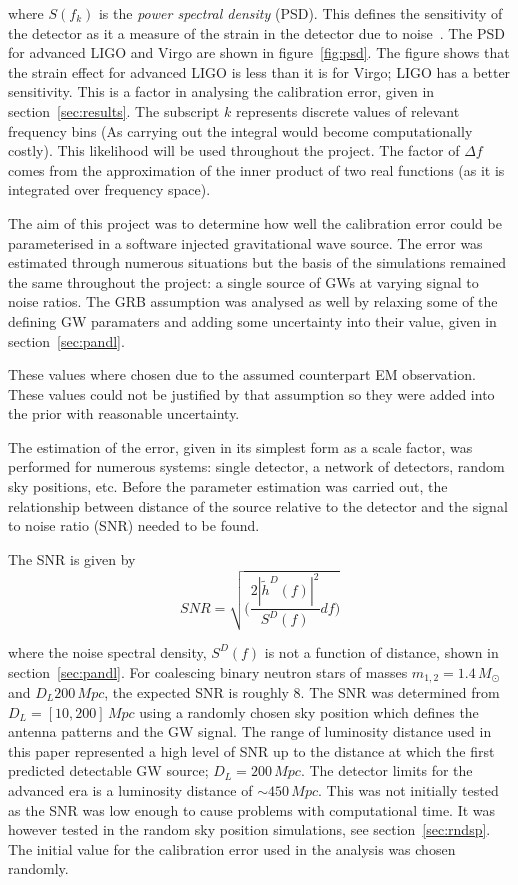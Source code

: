 \documentclass[12pt]{iopart}
\newcommand{\gws}{\tilde{h}}
\begin{document}
where $S(f_{k})$ is the \textit{power spectral density} (PSD). This defines the
sensitivity of the detector as it a measure of the strain in the detector due
to noise~\cite{SathSchutz,sens}. The PSD for advanced LIGO and Virgo are shown
in figure~\ref{fig:psd}. The figure shows that the strain effect for advanced
LIGO is less than it is for Virgo; LIGO has a better sensitivity. This is a
factor in analysing the calibration error, given in section~\ref{sec:results}.
The subscript $k$ represents discrete values of relevant frequency bins (As
carrying out the integral would become computationally costly). This likelihood
will be used throughout the project. The factor of $\Delta f$ comes from the
approximation of the inner product of two real functions (as it is integrated
over frequency space).

The aim of this project was to determine how well the calibration error could
be parameterised in a software injected gravitational wave source. The error
was estimated through numerous situations but the basis of the simulations
remained the same throughout the project: a single source of GWs at varying
signal to noise ratios. The GRB assumption was analysed as well by relaxing
some of the defining GW paramaters and adding some uncertainty into their
value, given in section~\ref{sec:pandl}.


These values where chosen due to the assumed counterpart EM observation. These
values could not be justified by that assumption so they were added into the
prior with reasonable uncertainty.

The estimation of the error, given in its simplest form as a scale factor, was
performed for numerous systems: single detector, a network of detectors, random
sky positions, etc. Before the parameter estimation was carried out, the
relationship between distance of the source relative to the detector and the
signal to noise ratio (SNR) needed to be found.

The SNR is given by
\begin{equation}
  \label{eq:snr}
  SNR = \sqrt{\Bigg( \frac{2 |\gws^D(f)|^2}{S^D(f)} df \Bigg)}
\end{equation}

where the noise spectral density, $S^D(f)$ is not a function of distance, shown
in section~\ref{sec:pandl}. For coalescing binary neutron stars of masses
$m_{1,2} = 1.4\,M_{\odot}$ and  $D_{L}200\,Mpc$, the expected SNR is roughly 8.
The SNR was determined from $D_{L} = [10,200]\,Mpc$  using a randomly chosen
sky position which defines the antenna patterns and the GW signal. The range of
luminosity distance used in this paper represented a high level of SNR up to
the distance at which the first predicted detectable GW source; $D_{L} =
200\,Mpc$. The detector limits for the advanced era is a luminosity distance of
$\sim 450\,Mpc$. This was not initially tested as the SNR was low enough to
cause problems with computational time. It was however tested in the random sky
position simulations, see section~\ref{sec:rndsp}. The initial value for the
calibration error used in the analysis was chosen randomly.
\end{document}
